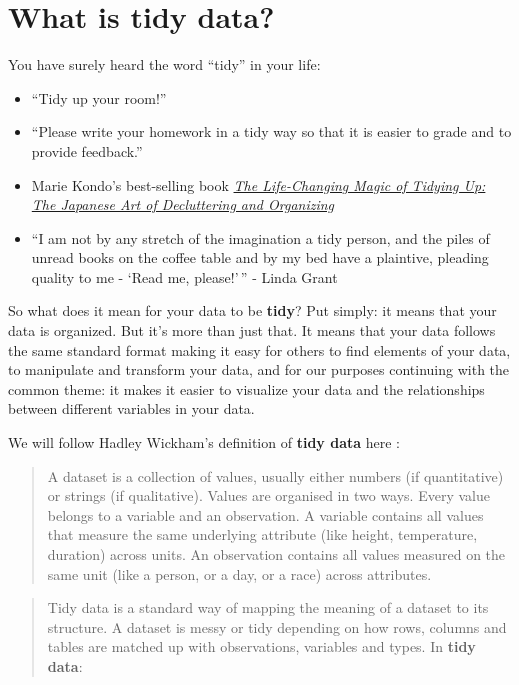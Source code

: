 \documentclass[]{tufte-book}
\providecommand{\tightlist}{%
  \setlength{\itemsep}{0pt}\setlength{\parskip}{0pt}}
\begin{document}
\section{What is tidy data?}\label{what-is-tidy-data}

You have surely heard the word ``tidy'' in your life:

\begin{itemize}
\tightlist
\item
  ``Tidy up your room!''
\item
  ``Please write your homework in a tidy way so that it is easier to
  grade and to provide feedback.''
\item
  Marie Kondo's best-selling book
  \href{https://www.amazon.com/Life-Changing-Magic-Tidying-Decluttering-Organizing/dp/1607747308/ref=sr_1_1?ie=UTF8\&qid=1469400636\&sr=8-1\&keywords=tidying+up}{\emph{The
  Life-Changing Magic of Tidying Up: The Japanese Art of Decluttering
  and Organizing}}
\item
  ``I am not by any stretch of the imagination a tidy person, and the
  piles of unread books on the coffee table and by my bed have a
  plaintive, pleading quality to me - `Read me, please!'\,'' - Linda
  Grant
\end{itemize}

So what does it mean for your data to be \textbf{tidy}? Put simply: it
means that your data is organized. But it's more than just that. It
means that your data follows the same standard format making it easy for
others to find elements of your data, to manipulate and transform your
data, and for our purposes continuing with the common theme: it makes it
easier to visualize your data and the relationships between different
variables in your data.

We will follow Hadley Wickham's definition of \textbf{tidy data} here
\citep{tidy}:

\begin{quote}
A dataset is a collection of values, usually either numbers (if
quantitative) or strings (if qualitative). Values are organised in two
ways. Every value belongs to a variable and an observation. A variable
contains all values that measure the same underlying attribute (like
height, temperature, duration) across units. An observation contains all
values measured on the same unit (like a person, or a day, or a race)
across attributes.
\end{quote}

\begin{quote}
Tidy data is a standard way of mapping the meaning of a dataset to its
structure. A dataset is messy or tidy depending on how rows, columns and
tables are matched up with observations, variables and types. In
\textbf{tidy data}:
\end{quote}
\end{document}
